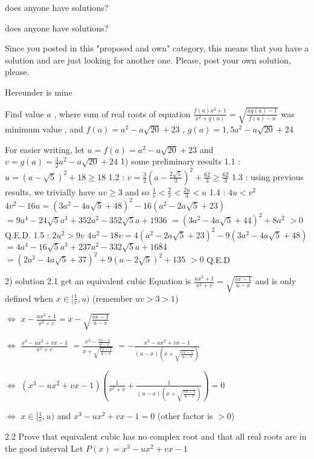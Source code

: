 \begin{solution}
	does anyone have solutions?
\end{solution}



\begin{solution}
	\begin{tcolorbox}does anyone have solutions?\end{tcolorbox}
Since you posted in this "proposed and own" category, this means that you have a solution and are just looking for another one.
Please, post your own solution, please.

Hereunder is mine

\begin{tcolorbox}Find value $a$ , where sum of real roots of equation $\frac{f(a)x^2 +1}{x^2+g(a)}=\sqrt{\frac{xg(a)-1}{f(a)-x}}$ was minimum value , and $f(a)=a^2-a\sqrt{20} +23$ , $g(a)=1,5a^2-a\sqrt{20}+24$\end{tcolorbox}
For easier writing, let $u=f(a)=a^2-a\sqrt{20}+23$ and $v=g(a)=\frac 32a^2-a\sqrt{20}+24$
1) some preliminary results
1.1 : $u=(a-\sqrt 5)^2+18\ge 18$
1.2 : $v=\frac 32(a-\frac{2\sqrt 5}3)^2+\frac{62}3\ge \frac{62}3$
1.3 : using previous results, we trivially have $uv\ge 3$ and so $\frac 1v<\frac 2v<\frac {2u}3<u$
1.4 : $4u < v^2$
$4v^2-16u=(3a^2-4a\sqrt{5}+48)^2-16(a^2-2a\sqrt{5}+23)$ $=9a^4-24\sqrt 5a^3+352a^2-352\sqrt 5a+1936$
$=(3a^2-4a\sqrt 5+44)^2+8a^2$ $>0$
Q.E.D.
1.5 : $2u^2 > 9v$
$4u^2-18v=4(a^2-2a\sqrt 5+23)^2-9(3a^2-4a\sqrt 5+48)$ $=4a^4-16\sqrt 5a^3+237a^2-332\sqrt 5a+1684$
$=(2a^2-4a\sqrt 5+37)^2+9(a-2\sqrt 5)^2+135$ $>0$
Q.E.D

2) solution
2.1 get an equivalent cubic
Equation is $\frac{ux^2+1}{x^2+v}=\sqrt{\frac{vx-1}{u-x}}$ and is only defined when $x\in[\frac 1v,u)$ (remember $uv>3>1$)

$\iff$ $x-\frac{ux^2+1}{x^2+v}=x-\sqrt{\frac{vx-1}{u-x}}$

$\iff$ $\frac{x^3-ux^2+vx-1}{x^2+v}$ $=\frac{x^2-\frac{vx-1}{u-x}}{x+\sqrt{\frac{vx-1}{u-x}}}$ $=-\frac{x^3-ux^2+vx-1}{(u-x)(x+\sqrt{\frac{vx-1}{u-x}})}$

$\iff$ $(x^3-ux^2+vx-1)\left(\frac 1{x^2+v}+\frac{1}{(u-x)(x+\sqrt{\frac{vx-1}{u-x}})}\right)=0$

$\iff$ $x\in[\frac 1v,u)$ and $x^3-ux^2+vx-1=0$ (other factor is $>0$)

2.2 Prove that equivalent cubic has no complex root and that all real roots are in the good interval
Let $P(x)=x^3-ux^2+vx-1$


\end{solution}
